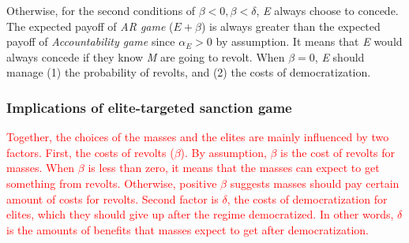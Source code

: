 \documentclass[11pt, letterpage]{article}
\begin{document}
Otherwise, for the second conditions of $\beta <0, \beta < \delta$, \textit{E} always choose to concede. The expected payoff of \textit{AR game} ($E+\beta$) is always greater than the expected payoff of \textit{Accountability game} since $\alpha_{E} > 0$ by assumption. It means that \textit{E} would always concede if they know \textit{M} are going to revolt. When $\beta = 0$, \textit{E} should manage (1) the probability of revolts, and (2) the costs of democratization.
	
\subsubsection*{Implications of elite-targeted sanction game}

\textcolor{red}{Together, the choices of the masses and the elites are mainly influenced by two factors. First, the costs of revolts ($\beta$). By assumption, $\beta$ is the cost of revolts for masses. When $\beta$ is less than zero, it means that the masses can expect to get something from revolts. Otherwise, positive $\beta$ suggests masses should pay certain amount of costs for revolts. Second factor is $\delta$, the costs of democratization for elites, which they should give up after the regime democratized. In other words, $\delta$ is the amounts of benefits that masses expect to get after democratization.}
\end{document}
